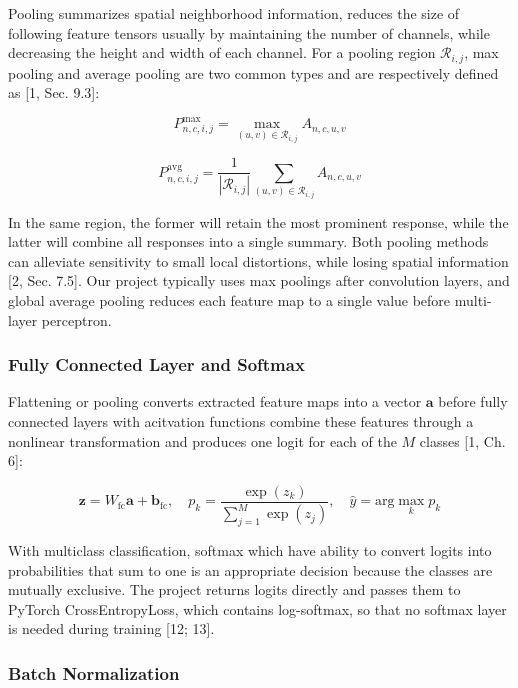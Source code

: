 \documentclass[11pt,a4paper]{article}
\begin{document}
Pooling summarizes spatial neighborhood information, reduces the size of following feature tensors usually by maintaining the number of channels, while decreasing the height and width of each channel. For a pooling region \({\mathcal{R}}_{i,j}\), max pooling and average pooling are two common types and are respectively defined as [1, Sec. 9.3]:

\[
{P}_{n,c,i,j}^{\max }={\max }_{(u,v)\in {\mathcal{R}}_{i,j}}{A}_{n,c,u,v}
\]

\[
{P}_{n,c,i,j}^{\mathrm{avg}}=\frac{1}{\left| {\mathcal{R}}_{i,j}\right| }\sum _{(u,v)\in {\mathcal{R}}_{i,j}} {A}_{n,c,u,v}
\]

In the same region, the former will retain the most prominent response, while the latter will combine all responses into a single summary. Both pooling methods can alleviate sensitivity to small local distortions, while losing spatial information [2, Sec. 7.5]. Our project typically uses max poolings after convolution layers, and global average pooling reduces each feature map to a single value before multi-layer perceptron.

\subsubsection{Fully Connected Layer and Softmax}\label{theory:2.2.5}

Flattening or pooling converts extracted feature maps into a vector \(\boldsymbol{a}\) before fully connected layers with acitvation functions combine these features through a nonlinear transformation and produces one logit for each of the \(M\) classes [1, Ch. 6]:

\[
\boldsymbol{z}={W}_{\mathrm{fc}}\boldsymbol{a}+{\boldsymbol{b}}_{\mathrm{fc}},\quad {p}_{k}=\frac{\exp ({z}_{k})}{\sum _{j=1}^{M} \exp ({z}_{j})},\quad \hat{y}=\mathrm{arg}{\max }_{k}{p}_{k}
\]

With multiclass classification, softmax which have ability to convert logits into probabilities that sum to one is an appropriate decision because the classes are mutually exclusive. The project returns logits directly and passes them to PyTorch CrossEntropyLoss, which contains log-softmax, so that no softmax layer is needed during training [12; 13].

\subsubsection{Batch Normalization}\label{theory:2.2.6}
\end{document}

